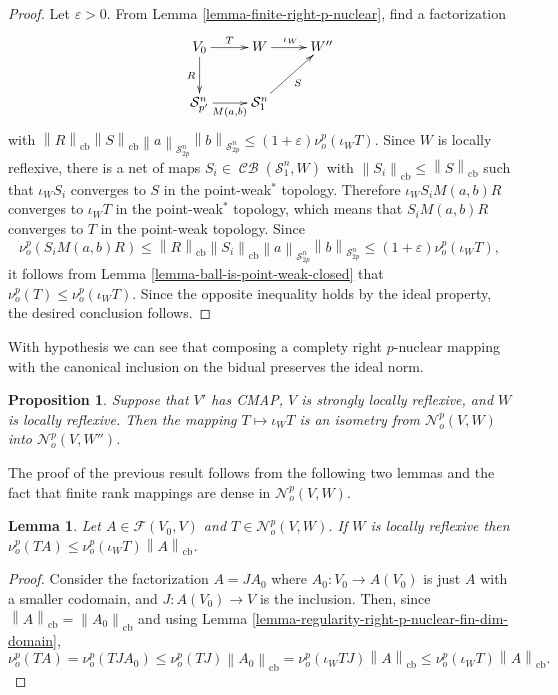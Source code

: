 \documentclass[11pt]{amsart}
\DeclareMathOperator{\cb}{cb}
\DeclareMathOperator{\CB}{\mathcal{CB}}
\newcommand{\n}[1]{ \left\|#1\right\| }
\newtheorem{lemma}[theorem]{Lemma}
\newtheorem{proposition}[theorem]{Proposition}
\numberwithin{equation}{section}
\begin{document}
\begin{proof}
Let $\varepsilon>0$. From Lemma \ref{lemma-finite-right-p-nuclear}, find a factorization
\[
\xymatrix{
V_0 \ar[r]^T \ar[d]_{R} &W \ar[r]^{\iota_W} &W''\\
\mathcal{S}^n_{p'} \ar[r]_{M(a,b)} &\mathcal{S}^n_1 \ar[ur]_{S} 
}
\]
with $\n{R}_{\cb} \n{S}_{\cb} \n{a}_{\mathcal{S}^n_{2p}} \n{b}_{\mathcal{S}^n_{2p}} \le (1+\varepsilon) \nu^p_o(\iota_W T)$.
Since $W$ is locally reflexive, there is a net of maps $S_i \in \CB(\mathcal{S}_1^n,W)$ with $\n{S_i}_{\cb} \le \n{S}_{\cb}$ such that $\iota_WS_i$ converges to $S$ in the point-weak$^*$ topology.
Therefore $\iota_WS_iM(a,b)R$ converges to $\iota_WT$ in the  point-weak$^*$ topology, which means that  $S_iM(a,b)R$ converges to $T$ in the point-weak topology.
Since 
\[
\nu^p_o(S_iM(a,b)R) \le \n{R}_{\cb} \n{S_i}_{\cb} \n{a}_{\mathcal{S}^n_{2p}} \n{b}_{\mathcal{S}^n_{2p}} \le (1+\varepsilon) \nu^p_o(\iota_W T),
\]
it follows from Lemma \ref{lemma-ball-is-point-weak-closed} that $\nu^p_o(T) \le \nu^p_o(\iota_W T)$.
Since the opposite inequality holds by the ideal property, the desired conclusion follows.
\end{proof}



With hypothesis we can see that composing a complety right $p$-nuclear mapping with the canonical inclusion on the bidual preserves the ideal norm.

\begin{proposition}\label{prop-regularity-right-p-nuclear-weakeer-assumption}
Suppose that $V'$ has CMAP, $V$ is strongly locally reflexive, and $W$ is locally reflexive.
Then the mapping $T \mapsto \iota_W T$ is an isometry from 
$\mathcal{N}^p_o(V,W)$ into $\mathcal{N}^p_o(V,W'')$.
\end{proposition}

The proof of the previous result follows from the following two lemmas and the fact that finite rank mappings are dense in $\mathcal{N}^p_o(V,W)$. 


\begin{lemma}\label{lemma-Pietsch-6-8-4-modified}
Let $A \in\mathcal{F}(V_0,V)$ and $T \in \mathcal{N}^p_o(V,W)$.
If $W$ is locally reflexive then
$\nu^p_o(TA) \le \nu^p_o(\iota_WT) \n{A}_{\cb}$.    
\end{lemma}

\begin{proof}
Consider the factorization $A = JA_0$ where $A_0 : V_0 \to A(V_0)$ is just $A$ with a smaller codomain, and $J : A(V_0) \to V$ is the inclusion. Then, since $\n{A}_{\cb} = \n{A_0}_{\cb}$ and using Lemma \ref{lemma-regularity-right-p-nuclear-fin-dim-domain},
\[
\nu^{p}_o(TA) = \nu^{p}_o(TJA_0) \le \nu^{p}_o(TJ)\n{A_0}_{\cb} = \nu^{p}_o(\iota_W TJ) \n{A}_{\cb} \le  \nu^p_o(\iota_W T) \n{A}_{\cb}.
\]
\end{proof}
\end{document}
